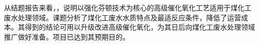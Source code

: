 从结题报告来看，，说明以强化芬顿技术为核心的高级催化氧化工艺适用于煤化工废水处理领域。课题分析了煤化工废水水质特点及最适反应条件，降低了运营成本。其得到的结论可用以升级改进高级催化氧化，为其日后向煤化工废水处理领域推广做好准备。项目已达到其预期目的。